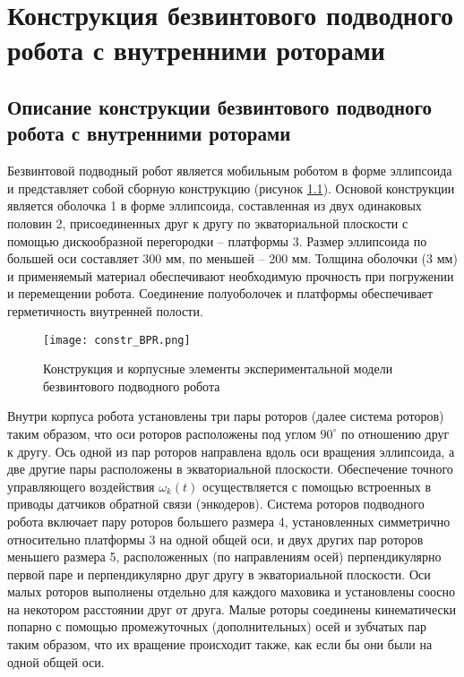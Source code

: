 \chapter{Конструкция безвинтового подводного робота с внутренними роторами}\label{ch:ch3}

\section{Описание конструкции безвинтового подводного робота с внутренними роторами}

Безвинтовой подводный робот является мобильным роботом в форме эллипсоида и представляет собой сборную конструкцию (рисунок \ref{constr_BPR}). Основой конструкции является оболочка 1 в форме эллипсоида, составленная из двух одинаковых половин 2, присоединенных друг к другу по экваториальной плоскости с помощью дискообразной перегородки – платформы 3. Размер эллипсоида по большей оси составляет 300 мм, по меньшей – 200 мм. Толщина оболочки (3 мм) и применяемый материал обеспечивают необходимую прочность при погружении и перемещении робота. Соединение полуоболочек и платформы обеспечивает герметичность внутренней полости.

\begin{figure}[h]
	\centering
	\texttt{[image: constr\_BPR.png]}%
	\caption{Конструкция и корпусные элементы экспериментальной модели безвинтового подводного робота}
	\label{constr_BPR}
\end{figure}

Внутри корпуса робота установлены три пары роторов (далее система роторов) таким образом, что оси роторов расположены под углом $90^\circ$ по отношению друг к другу. Ось одной из пар роторов направлена вдоль оси вращения эллипсоида, а две другие пары расположены в экваториальной плоскости. Обеспечение точного управляющего воздействия $\omega_k (t)$ осуществляется с помощью встроенных в приводы датчиков обратной связи (энкодеров). Система роторов подводного робота включает пару роторов большего размера 4, установленных симметрично относительно платформы 3 на одной общей оси, и двух других пар роторов меньшего размера 5, расположенных (по направлениям осей) перпендикулярно первой паре и перпендикулярно друг другу в экваториальной плоскости. Оси малых роторов выполнены отдельно для каждого маховика и установлены соосно на некотором расстоянии друг от друга. Малые роторы соединены кинематически попарно с помощью промежуточных (дополнительных) осей и зубчатых пар таким образом, что их вращение происходит также, как если бы они были на одной общей оси.

